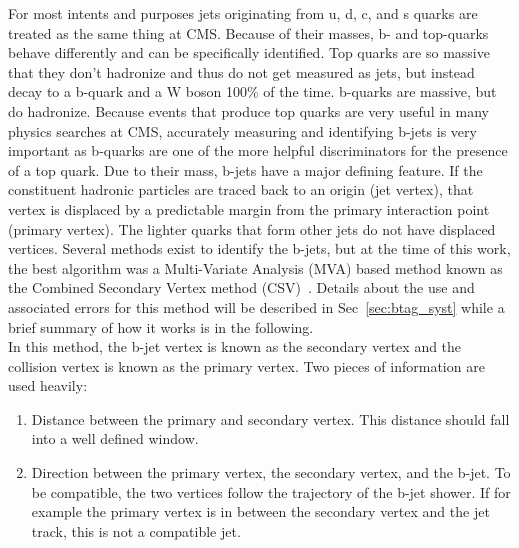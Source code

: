 	For most intents and purposes jets originating from u, d, c, and s quarks are treated as the same thing at CMS. Because of their masses, b- and top-quarks behave differently and can be specifically identified. Top quarks are so massive that they don't hadronize and thus do not get measured as jets, but instead decay to a b-quark and a W boson 100\% of the time. b-quarks are massive, but do hadronize. Because events that produce top quarks are very useful in many physics searches at CMS, accurately measuring and identifying b-jets is very important as b-quarks are one of the more helpful discriminators for the presence of a top quark. Due to their mass, b-jets have a major defining feature. If the constituent hadronic particles are traced back to an origin (jet vertex), that vertex is displaced by a predictable margin from the primary interaction point (primary vertex). The lighter quarks that form other jets do not have displaced vertices. Several methods exist to identify the b-jets, but at the time of this work, the best algorithm was a Multi-Variate Analysis (MVA) based method known as the Combined Secondary Vertex method (CSV)~\cite{btagging}. Details about the use and associated errors for this method will be described in Sec~\ref{sec:btag_syst} while a brief summary of how it works is in the following.\\
	
	In this method, the b-jet vertex is known as the secondary vertex and the collision vertex is known as the primary vertex. Two pieces of information are used heavily:
	\begin{enumerate}
	\item Distance between the primary and secondary vertex. This distance should fall into a well defined window.\\
	\item Direction between the primary vertex, the secondary vertex, and the b-jet. To be compatible, the two vertices follow the trajectory of the b-jet shower. If for example the primary vertex is in between the secondary vertex and the jet track, this is not a compatible jet.\\
	\end{enumerate}
	
